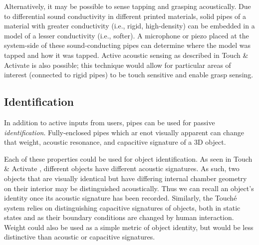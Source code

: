 Alternatively, it may be possible to sense tapping and grasping acoustically.  Due to differential sound conductivity in different printed materials, solid pipes of a material with greater conductivity (i.e., rigid, high-density) can be embedded in a model of a lesser conductivity (i.e., softer).  A microphone or piezo placed at the system-side of these sound-conducting pipes can determine where the model was tapped and how it was tapped.  Active acoustic sensing as described in Touch \& Activate \cite{Ono-touchandactivate} is also possible; this technique would allow for particular areas of interest (connected to rigid pipes) to be touch sensitive and enable grasp sensing.


\subsection{Identification}
In addition to active inputs from users, pipes can be used for passive \emph{identification}.  Fully-enclosed pipes which ar enot visually apparent can change that weight, acoustic resonance, and capacitive signature of a 3D object. 

Each of these properties could be used for object identification. As seen in Touch \& Activate \cite{Ono-touchandactivate}, different objects have different acoustic signatures.  As such, two objects that are visually identical but have differing internal chamber geometry on their interior may be distinguished acoustically.  Thus we can recall an object's identity once its acoustic signature has been recorded.  Similarly, the Touch\'{e} system \cite{Sato-touche} relies on distinguishing capacitive signatures of objects, both in static states and as their boundary conditions are changed by human interaction. Weight could also be used as a simple metric of object identity, but would be less distinctive than acoustic or capacitive signatures.


